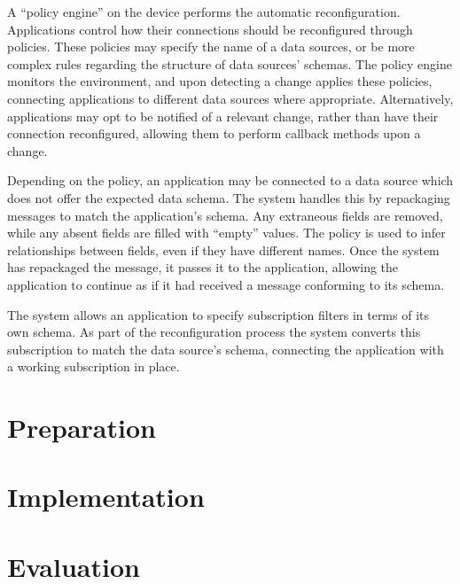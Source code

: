 \documentclass[12pt,twoside,notitlepage]{report}
\begin{document}
A ``policy engine'' on the device performs the automatic reconfiguration. 
Applications control how their connections should be reconfigured through policies. 
These policies may specify the name of a data sources, or be more complex rules regarding the structure of data sources' schemas. 
The policy engine monitors the environment, and upon detecting a change applies these policies, connecting applications to different data sources where appropriate.
Alternatively, applications may opt to be notified of a relevant change, rather than have their connection reconfigured, allowing them to perform callback methods upon a change.

Depending on the policy, an application may be connected to a data source which does not offer the expected data schema. 
The system handles this by repackaging messages to match the application's schema. Any extraneous fields are removed, while any absent fields are filled with ``empty'' values. The policy is used to infer relationships between fields, even if they have different names. 
Once the system has repackaged the message, it passes it to the application, allowing the application to continue as if it had received a message conforming to its schema.

The system allows an application to specify subscription filters in terms of its own schema. 
As part of the reconfiguration process the system converts this subscription to match the data source's schema, connecting the application with a working subscription in place.

\cleardoublepage

 
\chapter{Preparation}


\cleardoublepage


\chapter{Implementation}


\cleardoublepage


\chapter{Evaluation}
\end{document}
